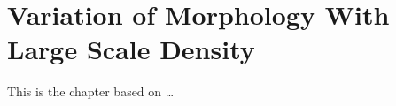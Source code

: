 \chapter{Variation of Morphology With Large Scale Density} \label{chap:morph_den}

This is the chapter based on \ldots